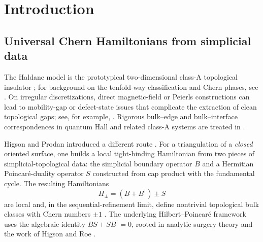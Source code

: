 \documentclass[11pt]{article}
\numberwithin{equation}{section}
\theoremstyle{definition}
\theoremstyle{remark}
\begin{document}
\begin{abstract}
\medskip
\noindent Companion
numerical code and the online supplement are available at the project repository
(\url{https://github.com/yspennstate/Doubling-and-Jamming-A-Universal-Chern-Hamiltonian-on-Triangulated-Surfaces-with-Boundary});
additional hexagonal and square two-band symbols, robustness variants, full appendix proofs,
and the numerical record are collected in that online supplement.
\end{abstract}

\section{Introduction}

\subsection{Universal Chern Hamiltonians from simplicial data}
The Haldane model is the prototypical two-dimensional class-A topological insulator
\cite{Haldane1988}; for background on the tenfold-way classification and Chern phases, see
\cite{SchnyderRyuFurusakiLudwig,KitaevPeriodic,QiZhangRMP,ProdanSchulzBaldesBook}. On irregular
discretizations, direct magnetic-field or Peierls constructions can lead to mobility-gap or
defect-state issues that complicate the extraction of clean topological gaps; see, for example,
\cite{Mitchell2018,BourneProdan2018,BourneMesland2019,ProdanSchulzBaldesBook}. Rigorous
bulk--edge and bulk--interface correspondences in quantum Hall and related class-A systems are
treated in
\cite{ElbauGraf2002,ElgartGrafSchenker2005,GrafPorta2013,BourneKellendonkRennie,KubotaControlled,EwertMeyer2019,AlldridgeMaxZirnbauer2020,LudewigThiangEdge}.

Higson and Prodan introduced a different route
\cite{HigsonProdanUniversalPRL,HigsonProdanUniversalArxiv}. For a triangulation of a \emph{closed}
oriented surface, one builds a local tight-binding Hamiltonian from two pieces of
simplicial-topological data: the simplicial boundary operator $B$ and a Hermitian Poincar\'e-duality
operator $S$ constructed from cap product with the fundamental cycle. The resulting Hamiltonians
\begin{equation}\label{eq:Hpm_intro}
H_\pm=(B+B^\dagger)\pm S
\end{equation}
are local and, in the sequential-refinement limit, define nontrivial topological bulk classes with
Chern numbers $\pm1$ \cite{HigsonProdanUniversalPRL,HigsonProdanUniversalArxiv}. The underlying
Hilbert--Poincar\'e framework uses the algebraic identity \(BS+SB^\dagger=0\), rooted in analytic
surgery theory and the work of Higson and Roe
\cite{HigsonRoeI,HigsonRoeII,HigsonRoeIII,WallSurgery}.
\end{document}

